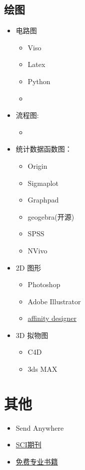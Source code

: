 \documentclass[UTF8,oneside]{ctexbook}
\begin{document}
\subsection{绘图}
\begin{itemize}
	\item 电路图
	      \begin{itemize}
		      \item Viso
		      \item Latex
		      \item Python
		      \item
	      \end{itemize}
	\item 流程图:
	      \begin{itemize}
		      \item
	      \end{itemize}
	\item 统计数据函数图：
	      \begin{itemize}
		      \item Origin
		      \item Sigmaplot
		      \item Graphpad
		      \item geogebra(开源)
		      \item SPSS
		      \item NVivo
	      \end{itemize}
	\item 2D 图形
	      \begin{itemize}
		      \item Photoshop
		      \item Adobe Illustrator
		      \item \href{https://affinity.serif.com/zh-cn/designer/}{affinity designer}
	      \end{itemize}
	\item 3D 拟物图
	      \begin{itemize}
		      \item C4D
		      \item 3ds MAX
	      \end{itemize}
\end{itemize}

\section{其他}
\begin{itemize}
	\item Send Anywhere
	\item \href{https://www.scimagojr.com}{SCI期刊}
	\item \href{http://libgen.io}{免费专业书籍}
\end{itemize}
\end{document}
